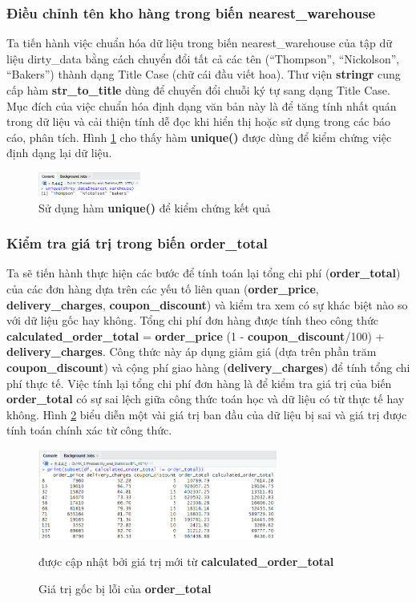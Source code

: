 \subsubsection{Điều chỉnh tên kho hàng trong biến nearest\_warehouse}

Ta tiến hành việc chuẩn hóa dữ liệu trong biến nearest\_warehouse của tập dữ liệu dirty\_data bằng cách chuyển đổi tất cả các tên (``Thompson'', ``Nickolson'',  ``Bakers'') thành dạng Title Case (chữ cái đầu viết hoa). Thư viện \textbf{stringr} cung cấp hàm \textbf{str\_to\_title} dùng để chuyển đổi chuỗi ký tự sang dạng Title Case. Mục đích của việc chuẩn hóa định dạng văn bản này là để tăng tính nhất quán trong dữ liệu và cải thiện tính dễ đọc khi hiển thị hoặc sử dụng trong các báo cáo, phân tích. Hình \ref{f4} cho thấy hàm \textbf{unique()} được dùng để kiểm chứng việc định dạng lại dữ liệu.
\begin{figure}[!htbp]
    \centering
    \includegraphics[width=0.3\textwidth]{graphics/Pre_processing_data/f4.PNG}
    \caption{Sử dụng hàm \textbf{unique()} để kiểm chứng kết quả}
    \label{f4}
\end{figure}

\subsubsection{Kiểm tra giá trị trong biến order\_total}
Ta sẽ tiến hành thực hiện các bước để tính toán lại tổng chi phí (\textbf{order\_total}) của các đơn hàng dựa trên các yếu tố liên quan (\textbf{order\_price}, \textbf{delivery\_charges}, \textbf{coupon\_discount}) và kiểm tra xem có sự khác biệt nào so với dữ liệu gốc hay không. Tổng chi phí đơn hàng được tính theo công thức \textbf{calculated\_order\_total} = \textbf{order\_price} \times (1 - \textbf{coupon\_discount}/100) + \textbf{delivery\_charges}. Công thức này áp dụng giảm giá (dựa trên phần trăm \textbf{coupon\_discount}) và cộng phí giao hàng (\textbf{delivery\_charges}) để tính tổng chi phí thực tế. Việc tính lại tổng chi phí đơn hàng là để kiểm tra giá trị của biến \textbf{order\_total} có sự sai lệch giữa công thức toán học và dữ liệu có từ thực tế hay không. Hình \ref{f5} biểu diễn một vài giá trị ban đầu của dữ liệu bị sai và giá trị được tính toán chính xác từ công thức.
\begin{figure}[!htbp]
    \centering
    \includegraphics[width=0.7\textwidth]{graphics/Pre_processing_data/f5.PNG}
    \caption{Giá trị gốc bị lỗi của \textbf{order\_total}} được cập nhật bởi giá trị mới từ \textbf{calculated\_order\_total} 
    \label{f5}
\end{figure}

